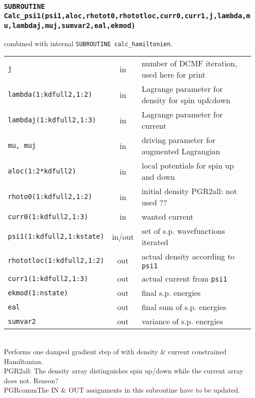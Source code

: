 \documentclass[final,1p]{elsarticle}
\newcommand{\PGRcomm}[1]{{\color{blue}\small PGR2all: #1}}
\begin{document}
\subsubsection*{\tt SUBROUTINE
  Calc\_psi1(psi1,aloc,rhotot0,rhototloc,curr0,curr1,j,lambda,mu,lambdaj,muj,sumvar2,eal,ekmod)}
\noindent
combined with internal {\tt SUBROUTINE calc\_hamiltonien}.
\\
\begin{tabular}{lcl}
 {\tt j} & in & number of DCMF iteration, used here for print\\
 {\tt lambda(1:kdfull2,1:2)} & in & Lagrange parameter for density for
 spin up\&down\\
 {\tt lambdaj(1:kdfull2,1:3)} & in & Lagrange parameter for current\\
 {\tt mu, muj} & in & driving parameter for augmented Lagrangian\\
 {\tt aloc(1:2*kdfull2)} & in & local potentials for spin up and down\\
 {\tt rhoto0(1:kdfull2,1:2)} & in & initial density \PGRcomm{not used ??}\\
 {\tt curr0(1:kdfull2,1:3)} & in & wanted current \\
 {\tt psi1(1:kdfull2,1:kstate)} & in/out & set of s.p. wavefunctions iterated\\
 {\tt rhototloc(1:kdfull2,1:2)} & out & actual density according to {\tt psi1}\\
 {\tt curr1(1:kdfull2,1:3)} & out & actual current from {\tt psi1}\\
 {\tt ekmod(1:nstate)} & out & final s.p. energies\\
 {\tt eal} & out & final sum of s.p. energies\\
 {\tt sumvar2} & out & variance of s.p. energies\\
\end{tabular}
\\[4pt]
Performs one damped gradient step of with density \& current
constrained Hamiltonian.
\\
\PGRcomm{The density array distinguishes spin up/down while the
  current array does not. Reason?}
\\
PGRcomm{The IN \& OUT assignments in this subroutine have to be updated.}
\end{document}
